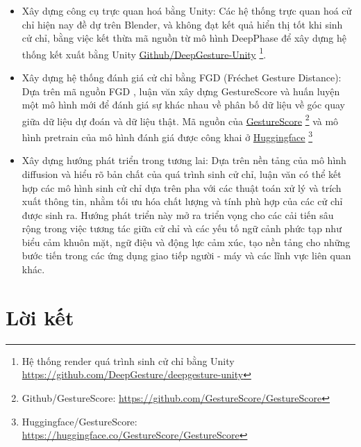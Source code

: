 \begin{itemize}
	\item Xây dựng công cụ trực quan hoá bằng Unity: Các hệ thống trực quan hoá cử chỉ hiện nay đề dự trên Blender, và không đạt kết quả hiển thị tốt khi sinh cử chỉ, bằng việc kết thừa mã nguồn từ mô hình DeepPhase \cite{starke2022deepphase} để xây dựng hệ thống kết xuất bằng Unity \hyperlink{https://github.com/DeepGesture/deepgesture-unity}{Github/DeepGesture-Unity}
	\footnote{Hệ thống render quá trình sinh cử chỉ bằng Unity \url{https://github.com/DeepGesture/deepgesture-unity}}.
	
	\item Xây dựng hệ thống đánh giá cử chỉ bằng FGD (Fréchet Gesture Distance): Dựa trên mã nguồn FGD \cite{yoon2020speech}, luận văn xây dựng GestureScore và huấn luyện một mô hình mới để đánh giá sự khác nhau về phân bố dữ liệu về góc quay giữa dữ liệu dự đoán và dữ liệu thật. Mã nguồn của  \hyperlink{https://github.com/GestureScore/GestureScore}{GestureScore} \footnote{Github/GestureScore: \url{https://github.com/GestureScore/GestureScore}} và mô hình pretrain của mô hình đánh giá được công khai ở  \hyperlink{https://huggingface.co/GestureScore}{Huggingface} \footnote{Huggingface/GestureScore: \url{https://huggingface.co/GestureScore/GestureScore}}
	\item Xây dựng hướng phát triển trong tương lai: Dựa trên nền tảng của mô hình diffusion và hiểu rõ bản chất của quá trình sinh cử chỉ, luận văn có thể kết hợp các mô hình sinh cử chỉ dựa trên pha với các thuật toán xử lý và trích xuất thông tin, nhằm tối ưu hóa chất lượng và tính phù hợp của các cử chỉ được sinh ra. Hướng phát triển này mở ra triển vọng cho các cải tiến sâu rộng trong việc tương tác giữa cử chỉ và các yếu tố ngữ cảnh phức tạp như biểu cảm khuôn mặt, ngữ điệu và động lực cảm xúc, tạo nền tảng cho những bước tiến trong các ứng dụng giao tiếp người - máy và các lĩnh vực liên quan khác.
\end{itemize}





\newpage


\section{Lời kết}

